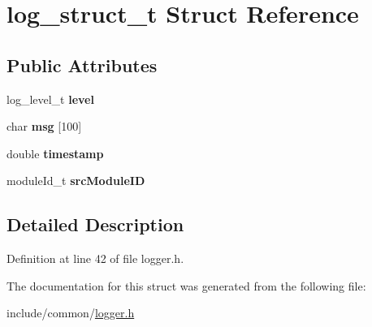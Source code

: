 \hypertarget{structlog__struct__t}{}\section{log\+\_\+struct\+\_\+t Struct Reference}
\label{structlog__struct__t}
\subsection*{Public Attributes}
\begin{DoxyCompactItemize}
\item 
\mbox{\label{structlog__struct__t_ab17eaca1fd2ec886aff4db33efa38d29}} 
log\+\_\+level\+\_\+t {\bfseries level}
\item 
\mbox{\label{structlog__struct__t_a4df114268b4a76cda98a857935e4309a}} 
char {\bfseries msg} \mbox{[}100\mbox{]}
\item 
\mbox{\label{structlog__struct__t_aa081dbf9f7e8bf4b214fedd40eea688e}} 
double {\bfseries timestamp}
\item 
\mbox{\label{structlog__struct__t_a46674802fa9e76e96243f0164d391696}} 
module\+Id\+\_\+t {\bfseries src\+Module\+ID}
\end{DoxyCompactItemize}


\subsection{Detailed Description}


Definition at line 42 of file logger.\+h.



The documentation for this struct was generated from the following file\+:\begin{DoxyCompactItemize}
\item 
include/common/\hyperlink{logger_8h}{logger.\+h}\end{DoxyCompactItemize}
